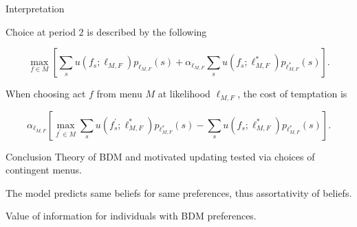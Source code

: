 \documentclass[usenames,dvipsnames,aspectratio=169,11pt, envcountsect]{beamer}
\begin{document}
\begin{frame}{Interpretation}

	Choice at period \( 2 \) is described by the following

	\vfill


	\[
		\max _{f \in M} \left[ \sum_{s} u \left( f_{s} ; \ell_{M, F} \right) p_{\ell_{M, F}} \left( s \right) +\alpha _{\ell_{M, F}} \sum_{s} u \left( f_{s} ; \ell^{*}_{M, F} \right) p_{\ell^{*}_{M, F}} \left( s \right) \right].
	\]

	\vfill \pause


	When choosing act \( f \) from menu \( M \) at likelihood \( \ell_{M, F} \), the cost of temptation is

	\vfill

	\[
		\alpha _{\ell_{M, F}} \left[ \max _{f^{\prime} \in M} \sum_{s} u\left(f^{\prime}_{s} ; \ell^{*}_{M, F} \right) p_{\ell^{*}_{M, F}} \left( s \right) - \sum_{s} u \left( f_{s} ; \ell^{*}_{M, F} \right) p_{\ell^{*}_{M, F}} \left( s \right) \right] .
	\]

\end{frame}

\begin{frame}{Conclusion}
	Theory of BDM and motivated updating tested via choices of contingent menus.

	\vfill

	The model predicts same beliefs for same preferences, thus assortativity of beliefs.

	\vfill

	Value of information for individuals with BDM preferences.

\end{frame}
\end{document}
